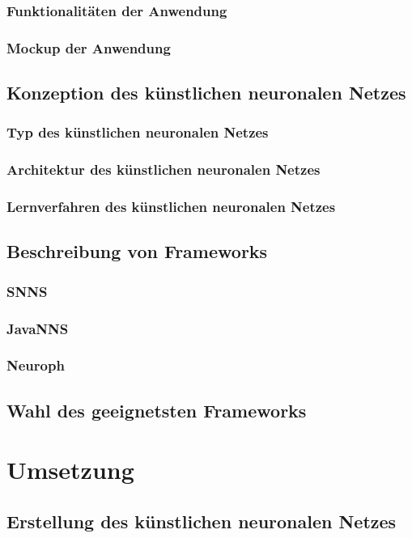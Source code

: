 \documentclass[11pt,a4paper]{scrreprt}
\begin{document}
		\subsection{Funktionalitäten der Anwendung} %
		\subsection{Mockup der Anwendung} %
	\section{Konzeption des künstlichen neuronalen Netzes} %
		\subsection{Typ des künstlichen neuronalen Netzes} %
		\subsection{Architektur des künstlichen neuronalen Netzes} %
		\subsection{Lernverfahren des künstlichen neuronalen Netzes} %
	\section{Beschreibung von Frameworks} %
		\subsection{SNNS} %
	  \subsection{JavaNNS}  %
		\subsection{Neuroph} %
	\section{Wahl des geeignetsten Frameworks} %
	
\chapter{Umsetzung} %
	\section{Erstellung des künstlichen neuronalen Netzes} %
\end{document}
